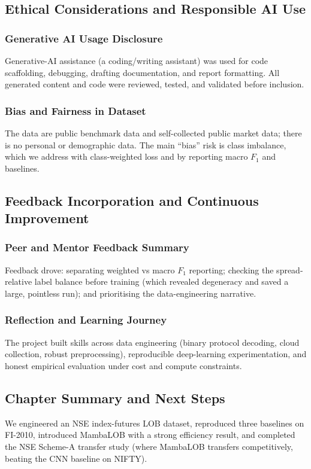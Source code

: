 \documentclass[11pt]{article}
\begin{document}
\subsection{Ethical Considerations and Responsible AI Use}
\subsubsection{Generative AI Usage Disclosure}
Generative-AI assistance (a coding/writing assistant) was used for code scaffolding, debugging, drafting
documentation, and report formatting. All generated content and code were reviewed, tested, and validated
before inclusion.
\subsubsection{Bias and Fairness in Dataset}
The data are public benchmark data and self-collected public market data; there is no personal or
demographic data. The main ``bias'' risk is class imbalance, which we address with class-weighted loss and
by reporting macro $F_1$ and baselines.

\subsection{Feedback Incorporation and Continuous Improvement}
\subsubsection{Peer and Mentor Feedback Summary}
Feedback drove: separating weighted vs macro $F_1$ reporting; checking the spread-relative label balance
before training (which revealed degeneracy and saved a large, pointless run); and prioritising the
data-engineering narrative.
\subsubsection{Reflection and Learning Journey}
The project built skills across data engineering (binary protocol decoding, cloud collection, robust
preprocessing), reproducible deep-learning experimentation, and honest empirical evaluation under cost and
compute constraints.

\subsection{Chapter Summary and Next Steps}
We engineered an NSE index-futures LOB dataset, reproduced three baselines on FI-2010, introduced MambaLOB
with a strong efficiency result, and completed the NSE Scheme-A transfer study (where MambaLOB transfers
competitively, beating the CNN baseline on NIFTY).
\end{document}
